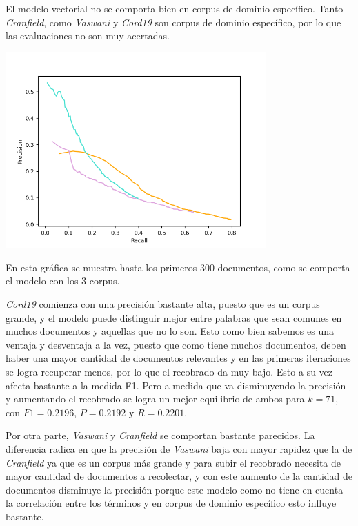 \documentclass{llncs}
\begin{document}
    El modelo vectorial no se comporta bien en corpus de dominio específico. Tanto \emph{Cranfield}, como \emph{Vaswani} y \emph{Cord19} son corpus de dominio específico, por lo que las evaluaciones no son muy acertadas.

    \begin{center}
        \includegraphics[width=10cm]{PR_plot(k=300).png}    
    \end{center}

    En esta gráfica se muestra hasta los primeros 300 documentos, como se comporta el modelo con los 3 corpus. 
        
    \emph{Cord19} comienza con una precisión bastante alta, puesto que es un corpus grande, y el modelo puede distinguir mejor entre palabras que sean comunes en muchos documentos y aquellas que no lo son. Esto como bien sabemos es una ventaja y desventaja a la vez, puesto que como tiene muchos documentos, deben haber una mayor cantidad de documentos relevantes y en las primeras iteraciones se logra recuperar menos, por lo que el recobrado da muy bajo. Esto a su vez afecta bastante a la medida F1. Pero a medida que va disminuyendo la precisión y aumentando el recobrado se logra un mejor equilibrio de ambos para $k = 71$, con $F1=0.2196$, $P=0.2192$ y $R=0.2201$.

    Por otra parte, \emph{Vaswani} y \emph{Cranfield} se comportan bastante parecidos. La diferencia radica en que la precisión de \emph{Vaswani} baja con mayor rapidez que la de \emph{Cranfield} ya que es un corpus más grande y para subir el recobrado necesita de mayor cantidad de documentos a recolectar, y con este aumento de la cantidad de documentos disminuye la precisión porque este modelo como no tiene en cuenta la correlación entre los términos y en corpus de dominio específico esto influye bastante. 
        
\end{document}
